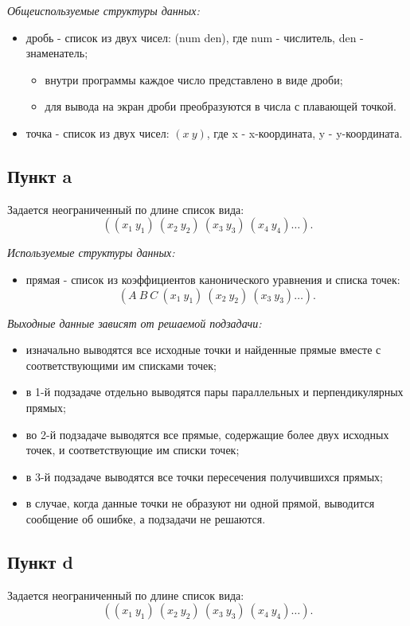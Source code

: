 \documentclass[a4paper, 11pt]{article}
\begin{document}
\textit{Общеиспользуемые структуры данных:}
\begin{itemize}
  \item дробь - список из двух чисел: (num den), где num - числитель, den - знаменатель;
  \begin{itemize}
    \item внутри программы каждое число представлено в виде дроби;
    \item для вывода на экран дроби преобразуются в числа с плавающей точкой.
  \end{itemize}
  \item точка - список из двух чисел: $(x\ y)$, где x - x-координата, y - y-координата.
\end{itemize}

\subsection*{Пункт a}
Задается неограниченный по длине список вида:
\[
((x_1\ y_1)\ (x_2\ y_2)\ (x_3\ y_3)\ (x_4\ y_4)\dots).
\]

\textit{Используемые структуры данных:}
\begin{itemize}
  \item прямая - список из коэффициентов канонического уравнения и списка точек: \[(A\ B\ C\ (x_1\ y_1)\ (x_2\ y_2)\ (x_3\ y_3)\dots).\]
\end{itemize}

\textit{Выходные данные зависят от решаемой подзадачи:}
\begin{itemize}
  \item изначально выводятся все исходные точки и найденные прямые вместе с соответствующими им списками точек;
  \item в 1-й подзадаче отдельно выводятся пары параллельных и перпендикулярных прямых;
  \item во 2-й подзадаче выводятся все прямые, содержащие более двух исходных точек, и соответствующие им списки точек;
  \item в 3-й подзадаче выводятся все точки пересечения получившихся прямых;
  \item в случае, когда данные точки не образуют ни одной прямой, выводится сообщение об ошибке, а подзадачи не решаются.
\end{itemize}

\subsection*{Пункт d}
Задается неограниченный по длине список вида:
\[
((x_1\ y_1)\ (x_2\ y_2)\ (x_3\ y_3)\ (x_4\ y_4)\dots).
\]
\end{document}

